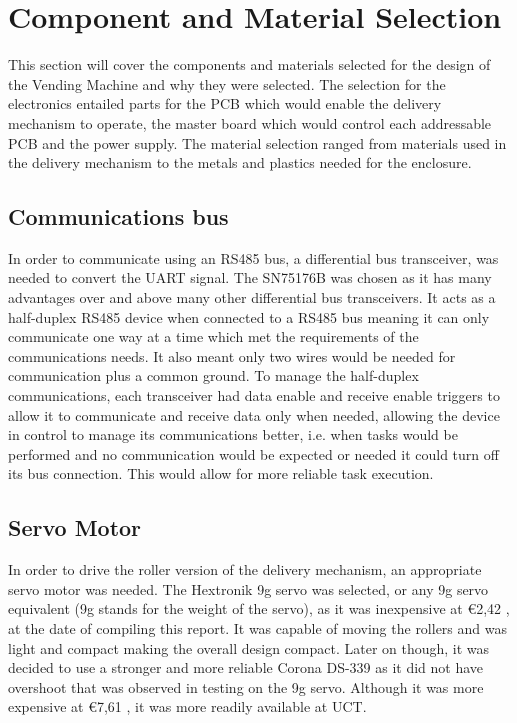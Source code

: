 \documentclass[a4paper,11pt]{article}
\numberwithin{figure}{section}
\numberwithin{table}{section}
\begin{document}
\newpage
\section{Component and Material Selection}\thispagestyle{sectionstart}
This section will cover the components and materials selected for the design of the Vending Machine and why they were selected. The selection for the electronics entailed parts for the PCB which would enable the delivery mechanism to operate, the master board which would control each addressable PCB and the power supply. The material selection ranged from materials used in the delivery mechanism to the metals and plastics needed for the enclosure.

\subsection{Communications bus}
\label{subsec:bus}
In order to communicate using an RS485 bus, a differential bus transceiver, was needed to convert the UART signal. The SN75176B was chosen as it has many advantages over and above many other differential bus transceivers. It acts as a half-duplex RS485 device when connected to a RS485 bus meaning it can only communicate one way at a time which met the requirements of the communications needs. It also meant only two wires would be needed for communication plus a common ground. To manage the half-duplex communications, each transceiver had data enable and receive enable triggers to allow it to communicate and receive data only when needed, allowing the device in control to manage its communications better, i.e. when tasks would be performed and no communication would be expected or needed it could turn off its bus connection. This would allow for more reliable task execution.

\subsection{Servo Motor}
In order to drive the roller version of the delivery mechanism, an appropriate servo motor was needed. The Hextronik 9g servo was selected, or any 9g servo equivalent (9g stands for the weight of the servo), as it was inexpensive at \euro 2,42 \cite{hobbyking}, at the date of compiling this report. It was capable of moving the rollers and was light and compact making the overall design compact. Later on though, it was decided to use a stronger and more reliable Corona DS-339 as it did not have overshoot that was observed in testing on the 9g servo. Although it was more expensive at \euro 7,61 \cite{hobbyking}, it was more readily available at UCT.
\end{document}
